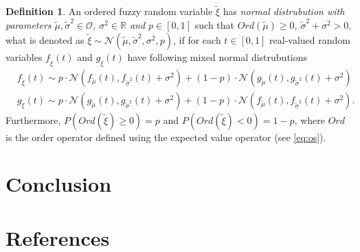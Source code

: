 \documentclass[review]{elsarticle}
\theoremstyle{definition}
\newtheorem{definition}{Definition}
\theoremstyle{theorem}
\begin{document}
\begin{definition}
An ordered fuzzy random variable $\tilde{\xi}$ has {\it normal distrubution with parameters $\tilde{\mu}, \tilde{\sigma}^2\in\mathcal{O}$, $\sigma^2\in\mathbb{R}$ and $p\in [0,1]$} such that $Ord(\tilde{\mu})\geq 0$, $\tilde{\sigma}^2+\sigma^2>0$, what is denoted as $\tilde{\xi}\sim \mathcal{N}(\tilde{\mu},\tilde{\sigma}^2,\sigma^2,p)$, if for each  $t\in[0,1]$ real-valued random variables $f_{\tilde{\xi}}(t)$ and $g_{\tilde{\xi}}(t)$ have following mixed normal distrubutions
\begin{align}
&f_{\tilde{\xi}}(t)\sim p\cdot \mathcal{N}\left(f_{\tilde{\mu}}(t),f_{\tilde{\sigma}^2}(t)+\sigma^2\right)+(1-p)\cdot \mathcal{N}\left(g_{\tilde{\mu}}(t),g_{\tilde{\sigma}^2}(t)+\sigma^2\right)\nonumber\\
&g_{\tilde{\xi}}(t)\sim p\cdot \mathcal{N}\left(g_{\tilde{\mu}}(t),g_{\tilde{\sigma}^2}(t)+\sigma^2\right)+(1-p)\cdot \mathcal{N}\left(f_{\tilde{\mu}}(t),f_{\tilde{\sigma}^2}(t)+\sigma^2\right).\nonumber
\end{align}
Furthermore, $ P(Ord(\tilde{\xi}) \geq 0) = p $ and $ P(Ord(\tilde{\xi}) <0) = 1-p $, where $ Ord $ is the order operator defined using the expected value operator (see \eqref{eq:os}).
\end{definition} 




\section{Conclusion}

\section*{References}


\end{document}

